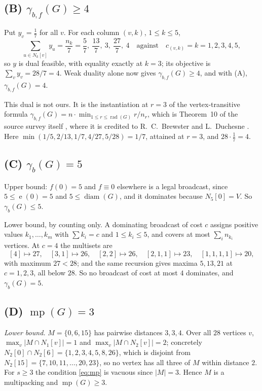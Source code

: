 \documentclass[11pt]{amsart}
\theoremstyle{remark}
\newcommand{\mult}{\operatorname{mp}}
\newcommand{\gb}{\gamma_b}
\newcommand{\gbf}{\gamma_{b,f}}
\newcommand{\ecc}{\operatorname{e}}
\newcommand{\rad}{\operatorname{rad}}
\newcommand{\diam}{\operatorname{diam}}
\begin{document}
\subsection*{(B) $\gbf(G)\ge4$}
Put $y_v=\tfrac17$ for all $v$. For each column $(v,k)$, $1\le k\le5$,
\[
 \sum_{u\in N_k[v]}y_u=\frac{n_k}{7}
 =\frac57,\ \frac{13}7,\ 3,\ \frac{27}7,\ 4
 \quad\text{against}\quad
 c_{(v,k)}=k=1,2,3,4,5 ,
\]
so $y$ is dual feasible, with equality exactly at $k=3$; its objective is
$\sum_v y_v=28/7=4$. Weak duality alone now gives $\gbf(G)\ge4$, and with (A),
$\gbf(G)=4$.

\smallskip
\begin{sloppypar}
This dual is not ours. It is the instantiation at $r=3$ of the vertex-transitive formula
$\gbf(G)=n\cdot\min_{1\le r\le\rad(G)} r/n_r$, which is Theorem~10 of the source survey
itself \cite{Teshima2014}, where it is credited to R.~C.~Brewster and L.~Duchesne \cite{BD}.
Here $\min(1/5,2/13,1/7,4/27,5/28)=1/7$, attained at $r=3$, and $28\cdot\tfrac17=4$.
\end{sloppypar}

\subsection*{(C) $\gb(G)=5$}
Upper bound: $f(0)=5$ and $f\equiv0$ elsewhere is a legal broadcast, since $5\le\ecc(0)=5$
and $5\le\diam(G)$, and it dominates because $N_5[0]=V$. So $\gb(G)\le5$.

Lower bound, by counting only. A dominating broadcast of cost $c$ assigns positive values
$k_1,\dots,k_m$ with $\sum k_i=c$ and $1\le k_i\le5$, and covers at most
$\sum_i n_{k_i}$ vertices. At $c=4$ the multisets are
\[
 [4]\mapsto 27,\quad
 [3,1]\mapsto 26,\quad
 [2,2]\mapsto 26,\quad
 [2,1,1]\mapsto 23,\quad
 [1,1,1,1]\mapsto 20,
\]
with maximum $27<28$; and the same recursion gives maxima $5,13,21$ at $c=1,2,3$, all
below $28$. So no broadcast of cost at most $4$ dominates, and $\gb(G)=5$.

\subsection*{(D) $\mult(G)=3$}
\emph{Lower bound.} $M=\{0,6,15\}$ has pairwise distances $3,3,4$. Over all $28$ vertices
$v$, $\max_v|M\cap N_1[v]|=1$ and $\max_v|M\cap N_2[v]|=2$; concretely
$N_2[0]\cap N_2[6]=\{1,2,3,4,5,8,26\}$, which is disjoint from
$N_2[15]=\{7,10,11,\dots,20,23\}$, so no vertex has all three of $M$ within distance $2$.
For $s\ge3$ the condition \eqref{eq:mp} is vacuous since $|M|=3$. Hence $M$ is a
multipacking and $\mult(G)\ge3$.
\end{document}
